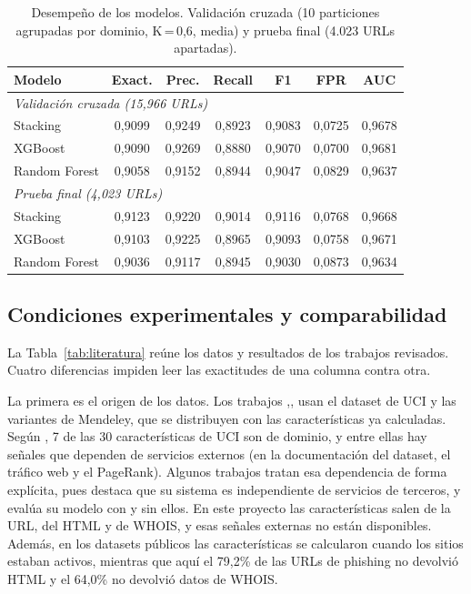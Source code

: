 \begin{table}[t]
\caption{Desempeño de los modelos. Validación cruzada (10 particiones agrupadas por dominio, K\,=\,0,6, media) y prueba final (4.023 URLs apartadas).}
\label{tab:resultados}
\centering
\footnotesize
\setlength{\tabcolsep}{2.4pt}
\begin{tabular}{lcccccc}
\hline
\textbf{Modelo} & \textbf{Exact.} & \textbf{Prec.} & \textbf{Recall} & \textbf{F1} & \textbf{FPR} & \textbf{AUC}\\
\hline
\multicolumn{7}{l}{\textit{Validación cruzada (15,966 URLs)}}\\
Stacking      & 0,9099 & 0,9249 & 0,8923 & 0,9083 & 0,0725 & 0,9678\\
XGBoost       & 0,9090 & 0,9269 & 0,8880 & 0,9070 & 0,0700 & 0,9681\\
Random Forest & 0,9058 & 0,9152 & 0,8944 & 0,9047 & 0,0829 & 0,9637\\
\hline
\multicolumn{7}{l}{\textit{Prueba final (4,023 URLs)}}\\
Stacking      & 0,9123 & 0,9220 & 0,9014 & 0,9116 & 0,0768 & 0,9668\\
XGBoost       & 0,9103 & 0,9225 & 0,8965 & 0,9093 & 0,0758 & 0,9671\\
Random Forest & 0,9036 & 0,9117 & 0,8945 & 0,9030 & 0,0873 & 0,9634\\
\hline
\end{tabular}
\end{table}

\subsection{Condiciones experimentales y comparabilidad}

La Tabla~\ref{tab:literatura} reúne los datos y resultados de los trabajos revisados. Cuatro diferencias impiden leer las exactitudes de una columna contra otra. \newline

La primera es el origen de los datos. Los trabajos \cite{kalabarige2022multilayer},\cite{kalabarige2023boosting},\cite{alsariera2020ai} usan el dataset de UCI y las variantes de Mendeley, que se distribuyen con las características ya calculadas. Según \cite{alsariera2020ai}, 7 de las 30 características de UCI son de dominio, y entre ellas hay señales que dependen de servicios externos (en la documentación del dataset, el tráfico web y el PageRank). Algunos trabajos tratan esa dependencia de forma explícita, pues \cite{sahingoz2019machine} destaca que su sistema es independiente de servicios de terceros, y \cite{rao2019detection} evalúa su modelo con y sin ellos. En este proyecto las características salen de la URL, del HTML y de WHOIS, y esas señales externas no están disponibles. Además, en los datasets públicos las características se calcularon cuando los sitios estaban activos, mientras que aquí el 79,2\% de las URLs de phishing no devolvió HTML y el 64,0\% no devolvió datos de WHOIS. \newline

